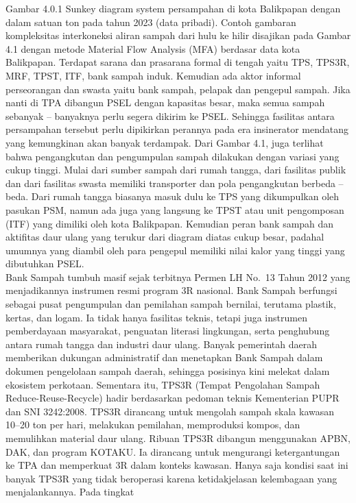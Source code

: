 \documentclass[
  letterpaper,
  DIV=11,
  numbers=noendperiod]{scrreprt}
\begin{document}
Gambar 4.0.1 Sunkey diagram system persampahan di kota Balikpapan dengan
dalam satuan ton pada tahun 2023 (data pribadi). Contoh gambaran
kompleksitas interkoneksi aliran sampah dari hulu ke hilir disajikan
pada Gambar 4.1 dengan metode Material Flow Analysis (MFA) berdasar data
kota Balikpapan. Terdapat sarana dan prasarana formal di tengah yaitu
TPS, TPS3R, MRF, TPST, ITF, bank sampah induk. Kemudian ada aktor
informal perseorangan dan swasta yaitu bank sampah, pelapak dan pengepul
sampah. Jika nanti di TPA dibangun PSEL dengan kapasitas besar, maka
semua sampah sebanyak -- banyaknya perlu segera dikirim ke PSEL.
Sehingga fasilitas antara persampahan tersebut perlu dipikirkan perannya
pada era insinerator mendatang yang kemungkinan akan banyak terdampak.
Dari Gambar 4.1, juga terlihat bahwa pengangkutan dan pengumpulan sampah
dilakukan dengan variasi yang cukup tinggi. Mulai dari sumber sampah
dari rumah tangga, dari fasilitas publik dan dari fasilitas swasta
memiliki transporter dan pola pengangkutan berbeda -- beda. Dari rumah
tangga biasanya masuk dulu ke TPS yang dikumpulkan oleh pasukan PSM,
namun ada juga yang langsung ke TPST atau unit pengomposan (ITF) yang
dimiliki oleh kota Balikpapan. Kemudian peran bank sampah dan aktifitas
daur ulang yang terukur dari diagram diatas cukup besar, padahal umumnya
yang diambil oleh para pengepul memiliki nilai kalor yang tinggi yang
dibutuhkan PSEL.\\
Bank Sampah tumbuh masif sejak terbitnya Permen LH No.~13 Tahun 2012
yang menjadikannya instrumen resmi program 3R nasional. Bank Sampah
berfungsi sebagai pusat pengumpulan dan pemilahan sampah bernilai,
terutama plastik, kertas, dan logam. Ia tidak hanya fasilitas teknis,
tetapi juga instrumen pemberdayaan masyarakat, penguatan literasi
lingkungan, serta penghubung antara rumah tangga dan industri daur
ulang. Banyak pemerintah daerah memberikan dukungan administratif dan
menetapkan Bank Sampah dalam dokumen pengelolaan sampah daerah, sehingga
posisinya kini melekat dalam ekosistem perkotaan. Sementara itu, TPS3R
(Tempat Pengolahan Sampah Reduce-Reuse-Recycle) hadir berdasarkan
pedoman teknis Kementerian PUPR dan SNI 3242:2008. TPS3R dirancang untuk
mengolah sampah skala kawasan 10--20 ton per hari, melakukan pemilahan,
memproduksi kompos, dan memulihkan material daur ulang. Ribuan TPS3R
dibangun menggunakan APBN, DAK, dan program KOTAKU. Ia dirancang untuk
mengurangi ketergantungan ke TPA dan memperkuat 3R dalam konteks
kawasan. Hanya saja kondisi saat ini banyak TPS3R yang tidak beroperasi
karena ketidakjelasan kelembagaan yang menjalankannya. Pada tingkat
\end{document}

